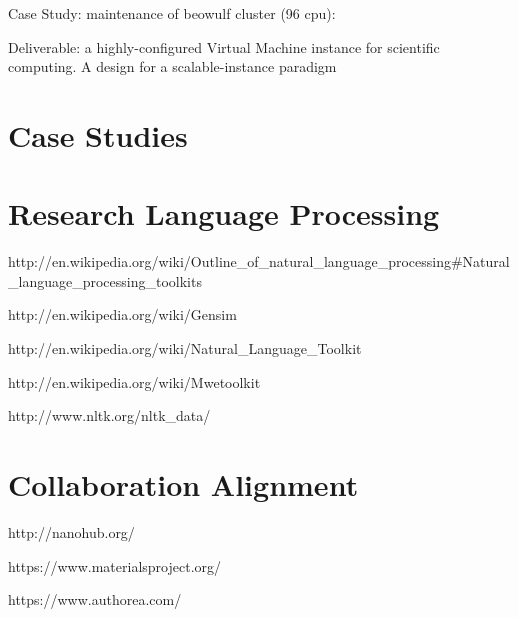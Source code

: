 Case Study: maintenance of beowulf cluster (96 cpu):


Deliverable: a highly-configured Virtual Machine instance for scientific computing.  
A design for a scalable-instance paradigm 

\section{Case Studies}

\section{Research Language Processing}

http://en.wikipedia.org/wiki/Outline_of_natural_language_processing#Natural_language_processing_toolkits

http://en.wikipedia.org/wiki/Gensim

http://en.wikipedia.org/wiki/Natural_Language_Toolkit

http://en.wikipedia.org/wiki/Mwetoolkit

http://www.nltk.org/nltk_data/



\section{Collaboration Alignment}

http://nanohub.org/

https://www.materialsproject.org/

https://www.authorea.com/




